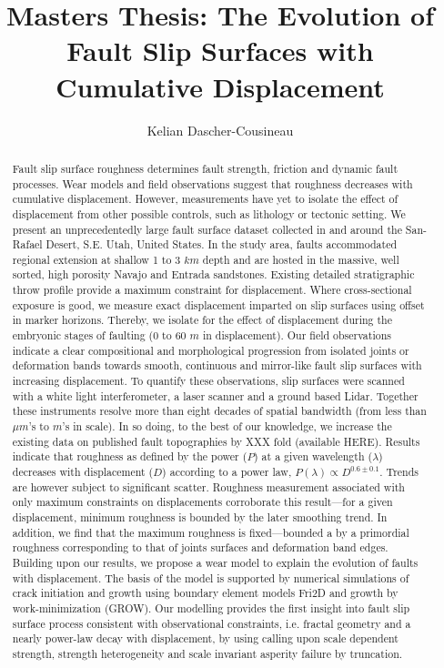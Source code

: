 \documentclass[12pt,a4paper]{article}
\author{Kelian Dascher-Cousineau}
\title{Masters Thesis: The Evolution of Fault Slip Surfaces with Cumulative Displacement}
\begin{document}
\maketitle


\begin{abstract}

Fault slip surface roughness determines fault strength, friction and dynamic fault processes. Wear models and field observations suggest that roughness decreases with cumulative displacement. However, measurements have yet to isolate the effect of displacement from other possible controls, such as lithology or tectonic setting. We present an unprecedentedly large fault surface dataset collected in and around the San-Rafael Desert, S.E. Utah, United States. In the study area, faults accommodated regional extension at shallow 1 to 3 $km$ depth and are hosted in the massive, well sorted, high porosity Navajo and Entrada sandstones. Existing detailed stratigraphic throw profile provide a maximum constraint for displacement. Where cross-sectional exposure is good, we measure exact displacement imparted on slip surfaces using offset in marker horizons. Thereby, we isolate for the effect of displacement during the embryonic stages of faulting (0 to 60 $m$ in displacement). Our field observations indicate a clear compositional and morphological progression from isolated joints or deformation bands towards smooth, continuous and mirror-like fault slip surfaces with increasing displacement. To quantify these observations, slip surfaces were scanned with a white light interferometer, a laser scanner and a ground based Lidar. Together these instruments resolve more than eight decades of spatial bandwidth (from less than $\mu m$'s to $m$'s in scale). In so doing, to the best of our knowledge, we increase the existing data on published fault topographies by XXX fold (available HERE). Results indicate that roughness as defined by the power ($P$) at a given wavelength ($\lambda$) decreases with displacement ($D$) according to a power law, $P(\lambda) \varpropto D^{0.6 \pm 0.1}$. Trends are however subject to significant scatter. Roughness measurement associated with only maximum constraints on displacements corroborate this result—for a given displacement, minimum roughness is bounded by the later smoothing trend. In addition, we find that the maximum roughness is fixed—bounded a by a primordial roughness corresponding to that of joints surfaces and deformation band edges. Building upon our results, we propose a wear model to explain the evolution of faults with displacement. The basis of the model is supported by numerical simulations of crack initiation and growth using boundary element models Fri2D and growth by work-minimization (GROW). Our modelling provides the first insight into fault slip surface process consistent with observational constraints, i.e. fractal geometry and a nearly power-law decay with displacement, by using calling upon scale dependent strength, strength heterogeneity and scale invariant asperity failure by truncation.

\end{abstract}
\end{document}
